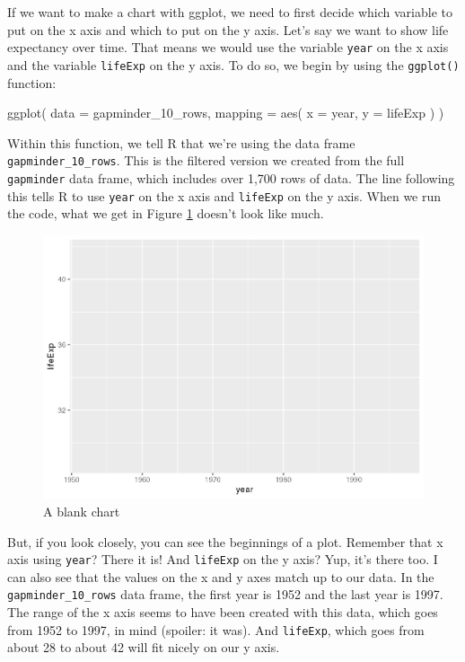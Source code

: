 \documentclass[
]{book}
\newenvironment{Shaded}{\begin{snugshade}}{\end{snugshade}}
\newcommand{\AttributeTok}[1]{\textcolor[rgb]{0.77,0.63,0.00}{#1}}
\newcommand{\FunctionTok}[1]{\textcolor[rgb]{0.00,0.00,0.00}{#1}}
\newcommand{\NormalTok}[1]{#1}
\begin{document}
If we want to make a chart with ggplot, we need to first decide which variable to put on the x axis and which to put on the y axis. Let's say we want to show life expectancy over time. That means we would use the variable \texttt{year} on the x axis and the variable \texttt{lifeExp} on the y axis. To do so, we begin by using the \texttt{ggplot()} function:

\begin{Shaded}
\begin{Highlighting}[]
\FunctionTok{ggplot}\NormalTok{(}
  \AttributeTok{data =}\NormalTok{ gapminder\_10\_rows,}
  \AttributeTok{mapping =} \FunctionTok{aes}\NormalTok{(}
    \AttributeTok{x =}\NormalTok{ year,}
    \AttributeTok{y =}\NormalTok{ lifeExp}
\NormalTok{  )}
\NormalTok{)}
\end{Highlighting}
\end{Shaded}

Within this function, we tell R that we're using the data frame \texttt{gapminder\_10\_rows}. This is the filtered version we created from the full \texttt{gapminder} data frame, which includes over 1,700 rows of data. The line following this tells R to use \texttt{year} on the x axis and \texttt{lifeExp} on the y axis. When we run the code, what we get in Figure \ref{fig:blank-ggplot} doesn't look like much.

\begin{figure}
\includegraphics[width=1\linewidth]{data-viz_files/figure-latex/blank-ggplot-1} \caption{A blank chart}\label{fig:blank-ggplot}
\end{figure}

But, if you look closely, you can see the beginnings of a plot. Remember that x axis using \texttt{year}? There it is! And \texttt{lifeExp} on the y axis? Yup, it's there too. I can also see that the values on the x and y axes match up to our data. In the \texttt{gapminder\_10\_rows} data frame, the first year is 1952 and the last year is 1997. The range of the x axis seems to have been created with this data, which goes from 1952 to 1997, in mind (spoiler: it was). And \texttt{lifeExp}, which goes from about 28 to about 42 will fit nicely on our y axis.
\end{document}
